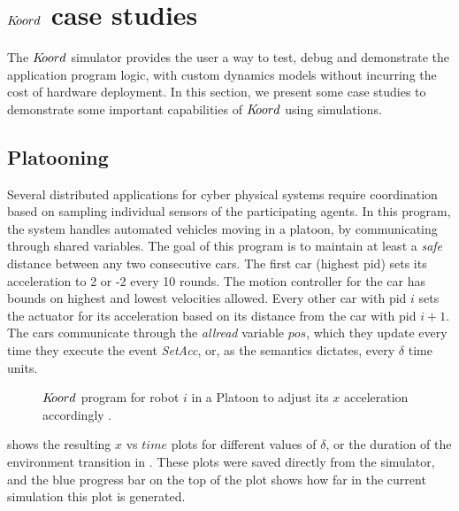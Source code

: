 \section{$K\kern-2pt oord$ case studies}

The $K\kern-2pt oord$ simulator provides the user a way to test, debug and demonstrate the application program logic, with custom dynamics models without incurring the cost of hardware deployment. In this section, we present some case studies to demonstrate some important capabilities of $K\kern-2pt oord$ using simulations. 
\subsection{Platooning}
\label{sec:platooning}
Several distributed applications for cyber physical systems require coordination based on sampling individual sensors of the participating agents. In this program, the system handles automated vehicles moving in a platoon, by communicating through shared variables. The goal of this program is to maintain at least a \emph{safe} distance between any two consecutive cars. The first car (highest pid) sets its acceleration to 2 or -2 every 10 rounds. The motion controller for the car has bounds on highest and lowest velocities allowed. Every other car with pid $i$ sets the actuator for its acceleration based on its distance from the car with pid $i+1$. The cars communicate through the \emph{allread} variable $\mathit{pos}$, which they update every time they execute the event \emph{SetAcc}, or, as the semantics dictates, every $\delta$ time units.

\begin{figure}[ht!]
    \noindent
    \begin{center}
        \scriptsize
        {}
        {}
    \end{center}
    \caption{$K\kern-2pt oord$ program for robot $i$ in a Platoon to adjust its $x$ acceleration accordingly .}
    \label{fig:platooningapp}
\end{figure}


 shows the resulting $x$ vs $\mathit{time}$ plots for different values of $\delta$, or the duration of the environment transition in . These plots were saved directly from the simulator, and the blue progress bar on the top of the plot shows how far in the current simulation this plot is generated.

